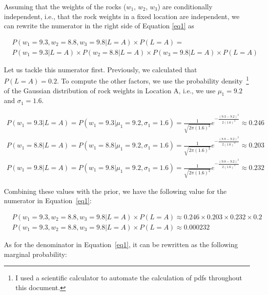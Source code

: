 \documentclass[leqno]{article}
\begin{document}
\noindent Assuming that the weights of the rocks ($w_1$, $w_2$, $w_3$) are conditionally independent, i.e., that the rock weights in a fixed location are independent,
we can rewrite the numerator in the right side of Equation \ref{eq1} as

\begin{equation*}
\begin{split}
&P(w_1 = 9.3, w_2 = 8.8, w_3 = 9.8| L = A) \times P(L = A) = 
\\
&P(w_1 = 9.3 | L = A) \times P(w_2 = 8.8 | L = A) \times P(w_3 = 9.8| L = A) \times P(L = A)
\end{split}
\end{equation*}

\noindent Let us tackle this numerator first. Previously, we calculated that $P(L = A) = 0.2$. To compute the other factors, we use the probability density~\footnote{I used a scientific calculator to automate the calculation of pdfs throughout this document.} of the 
Gaussian distribution of rock weights in Location A, i.e., we use $\mu_1 = 9.2$ and $\sigma_1 = 1.6$.

\begin{equation*}
\begin{split}
P(w_1 = 9.3 | L = A) = P(w_1 = 9.3 | \mu_1 = 9.2, \sigma_1 = 1.6) = \frac{1}{\sqrt{2\pi(1.6)^2}}e^{-\frac{(9.3 - 9.2)^2}{2(1.6)^2}} \approx 0.246 
\\
P(w_1 = 8.8 | L = A) = P(w_1 = 8.8 | \mu_1 = 9.2, \sigma_1 = 1.6) = \frac{1}{\sqrt{2\pi(1.6)^2}}e^{-\frac{(8.8 - 9.2)^2}{2(1.6)^2}} \approx 0.203
\\
P(w_1 = 9.8 | L = A) = P(w_1 = 9.8 | \mu_1 = 9.2, \sigma_1 = 1.6) = \frac{1}{\sqrt{2\pi(1.6)^2}}e^{-\frac{(9.8 - 9.2)^2}{2(1.6)^2}} \approx 0.232
\end{split}
\end{equation*}
  
\noindent Combining these values with the prior, we have the following value for the numerator in Equation~\ref{eq1}:

\begin{equation*}
\begin{split}
&P(w_1 = 9.3, w_2 = 8.8, w_3 = 9.8| L = A) \times P(L = A) \approx 0.246 \times 0.203 \times 0.232 \times 0.2
\\
&P(w_1 = 9.3, w_2 = 8.8, w_3 = 9.8| L = A) \times P(L = A) \approx 0.000232
\end{split} 
\end{equation*}

\noindent As for the denominator in Equation~\ref{eq1}, it can be rewritten as the following marginal probability:
\end{document}
